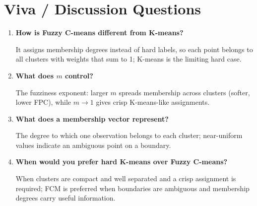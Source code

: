 \section{Viva / Discussion Questions}
\begin{enumerate}
  \item \textbf{How is Fuzzy C-means different from K-means?}\par\nobreak It assigns membership degrees instead
  of hard labels, so each point belongs to all clusters with weights that sum to 1; K-means
  is the limiting hard case.
  \item \textbf{What does $m$ control?}\par\nobreak The fuzziness exponent: larger $m$ spreads membership across
  clusters (softer, lower FPC), while $m \to 1$ gives crisp K-means-like assignments.
  \item \textbf{What does a membership vector represent?}\par\nobreak The degree to which one observation
  belongs to each cluster; near-uniform values indicate an ambiguous point on a boundary.
\item \textbf{When would you prefer hard K-means over Fuzzy C-means?}\par\nobreak When clusters are compact and well separated and a crisp assignment is required; FCM is preferred when boundaries are ambiguous and membership degrees carry useful information.
\end{enumerate}

